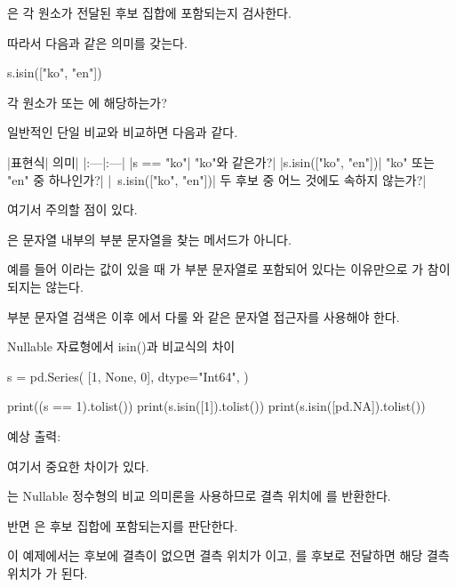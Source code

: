 은 각 원소가 전달된 후보 집합에 포함되는지 검사한다.

따라서 다음과 같은 의미를 갖는다.

\begin{dhkcode}
s.isin(["ko", "en"])
\end{dhkcode}

각 원소가  또는 에 해당하는가?

일반적인 단일 비교와 비교하면 다음과 같다.

\begin{dhktable}
|표현식|	의미|
|:---|:---|
|s == "ko"|	"ko"와 같은가?|
|s.isin(["ko", "en"])|	"ko" 또는 "en" 중 하나인가?|
|~s.isin(["ko", "en"])|	두 후보 중 어느 것에도 속하지 않는가?|
\end{dhktable}

여기서 주의할 점이 있다.

은 문자열 내부의 부분 문자열을 찾는 메서드가 아니다.

예를 들어 이라는 값이 있을 때 가 부분 문자열로 포함되어 있다는 이유만으로 가 참이 되지는 않는다.

부분 문자열 검색은 이후 에서 다룰 와 같은 문자열 접근자를 사용해야 한다.

\begin{dhknote}
\begin{dhksmry}[centered]
Nullable 자료형에서 isin()과 비교식의 차이
\end{dhksmry}
\end{dhknote}

\begin{dhkcode}
s = pd.Series(
    [1, None, 0],
    dtype="Int64",
)

print((s == 1).tolist())
print(s.isin([1]).tolist())
print(s.isin([pd.NA]).tolist())
\end{dhkcode}

예상 출력:

\begin{dhkzsh}
\end{dhkzsh}

여기서 중요한 차이가 있다.

\zsh{==}는 Nullable 정수형의 비교 의미론을 사용하므로 결측 위치에 를 반환한다.

반면 은 후보 집합에 포함되는지를 판단한다.

이 예제에서는 후보에 결측이 없으면 결측 위치가 이고, 를 후보로 전달하면 해당 결측 위치가 가 된다.

